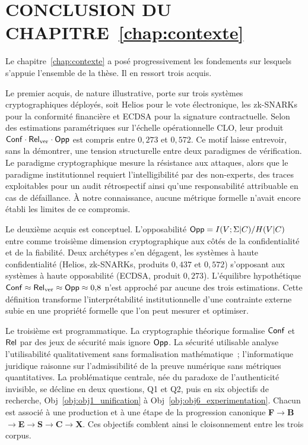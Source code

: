 
\section{CONCLUSION DU CHAPITRE~\ref{chap:contexte}}
\label{sec:conclusion_contexte}

\begin{sloppypar}
Le chapitre~\ref{chap:contexte} a pos\'e progressivement les fondements sur lesquels
s'appuie l'ensemble de la th\`ese. Il en ressort trois acquis.

Le premier acquis, de nature illustrative, porte sur trois syst\`emes cryptographiques d\'eploy\'es,
soit Helios pour le vote \'electronique, les zk-SNARKs pour la conformit\'e
financi\`ere et ECDSA pour la signature contractuelle. Selon des
estimations param\'etriques sur l'\'echelle op\'erationnelle CLO, leur produit
$\mathsf{Conf}\cdot\mathsf{Rel}_{\mathrm{ver}}\cdot\mathsf{Opp}$ est compris entre $0{,}273$ et $0{,}572$. Ce motif
laisse entrevoir, sans la d\'emontrer, une tension structurelle entre deux paradigmes
de v\'erification.
Le paradigme cryptographique mesure la r\'esistance aux attaques, alors que le
paradigme institutionnel requiert l'intelligibilit\'e par des non-experts,
des traces exploitables pour un audit r\'etrospectif ainsi qu'une responsabilit\'e
attribuable en cas de d\'efaillance. \`A notre connaissance, aucune m\'etrique formelle n'avait encore
\'etabli les limites de ce compromis.

Le deuxi\`eme acquis est conceptuel. L'opposabilit\'e
$\mathsf{Opp} = I(V;\Sigma|C)/H(V|C)$ entre comme troisi\`eme dimension
cryptographique aux c\^ot\'es de la confidentialit\'e et de la
fiabilit\'e. Deux arch\'etypes s'en d\'egagent, les syst\`emes \`a
haute confidentialit\'e (Helios, zk-SNARKs, produits $0{,}437$ et
$0{,}572$) s'opposant aux syst\`emes \`a haute opposabilit\'e (ECDSA,
produit $0{,}273$). L'\'equilibre hypoth\'etique
$\mathsf{Conf} \approx \mathsf{Rel}_{\mathrm{ver}} \approx \mathsf{Opp} \approx 0{,}8$ n'est approch\'e par aucune
des trois estimations. Cette d\'efinition transforme
l'interpr\'etabilit\'e institutionnelle d'une contrainte externe
subie en une propri\'et\'e formelle que l'on peut mesurer et optimiser.

Le troisi\`eme est programmatique. La cryptographie th\'eorique
formalise $\mathsf{Conf}$ et $\mathsf{Rel}$ par des jeux de s\'ecurit\'e mais ignore
$\mathsf{Opp}$. La s\'ecurit\'e utilisable analyse l'utilisabilit\'e
qualitativement sans formalisation math\'ematique~; l'informatique
juridique raisonne sur l'admissibilit\'e de la preuve num\'erique
sans m\'etriques quantitatives. La probl\'ematique centrale, n\'ee du paradoxe de l'authenticit\'e invisible, se d\'ecline
en deux questions, Q1 et Q2, puis en six objectifs de recherche,
Obj~\ref{obj:obj1_unification} \`a Obj~\ref{obj:obj6_experimentation}. Chacun est associ\'e
\`a une production et \`a une \'etape
de la progression canonique
\textbf{F}$\to$\textbf{B}$\to$\textbf{E}$\to$\textbf{S}$\to$\textbf{C}$\to$\textbf{X}.
Ces objectifs comblent ainsi le cloisonnement entre les trois corpus.


\end{sloppypar}
